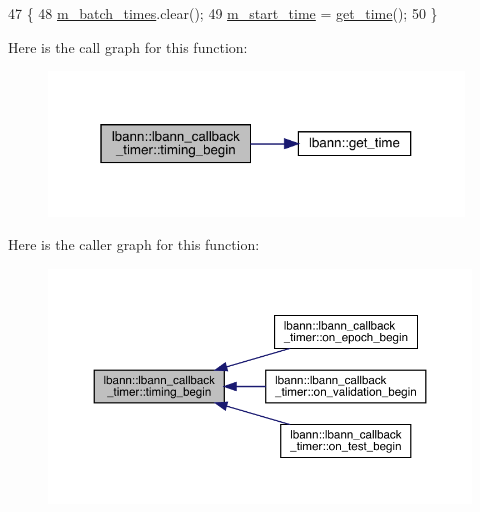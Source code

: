 \begin{DoxyCode}
47                                                 \{
48   \hyperlink{classlbann_1_1lbann__callback__timer_ae20dcc6bf921444e2724478ba751ade1}{m\_batch\_times}.clear();
49   \hyperlink{classlbann_1_1lbann__callback__timer_a5e65e92eadce733120772d420ffbb7d5}{m\_start\_time} = \hyperlink{namespacelbann_a478d36031ff0659893c4322cd856157f}{get\_time}();
50 \}
\end{DoxyCode}
Here is the call graph for this function\+:\nopagebreak
\begin{figure}[H]
\begin{center}
\leavevmode
\includegraphics[width=313pt]{classlbann_1_1lbann__callback__timer_a5eb2a9d5c0c2fe4a7d7f45369928e2fd_cgraph}
\end{center}
\end{figure}
Here is the caller graph for this function\+:\nopagebreak
\begin{figure}[H]
\begin{center}
\leavevmode
\includegraphics[width=350pt]{classlbann_1_1lbann__callback__timer_a5eb2a9d5c0c2fe4a7d7f45369928e2fd_icgraph}
\end{center}
\end{figure}
\mbox{\label{classlbann_1_1lbann__callback__timer_a955e59858c6803e96b21fe494cdf3971}} 
